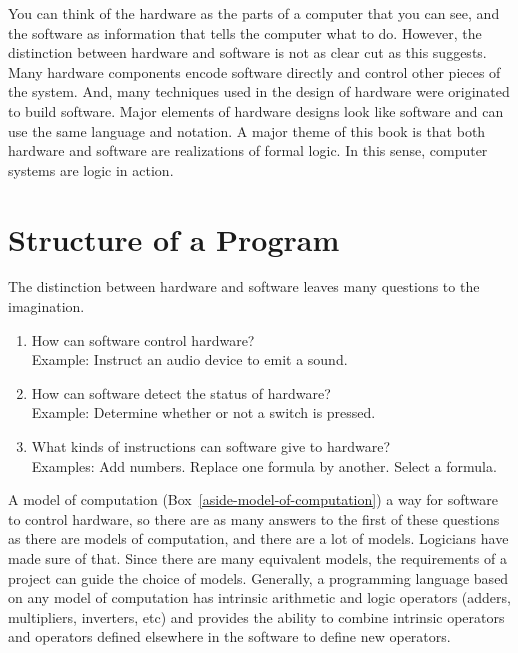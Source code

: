 You can think of the hardware as
the parts of a computer that you can see,
and the software as information that tells the computer what to do.
However, the distinction between hardware and software is not as
clear cut as this suggests. Many hardware components
encode software directly and control other pieces of the system.
And, many techniques used in the design of
hardware were originated to build software.
Major elements of hardware designs look like software
and can use the same language and notation.
A major theme of this book
is that both hardware and software are realizations of formal logic.
In this sense, computer systems are
logic in action.

\section{Structure of a Program}

The distinction between hardware and software
leaves many questions to the imagination.
\begin{enumerate}
\item How can software control hardware?\\
      Example: Instruct an audio device to emit a sound.
\item How can software detect the status of hardware?\\
      Example: Determine whether or not a switch is pressed.
\item What kinds of instructions can software give to hardware?\\
      Examples: Add numbers. Replace one formula by another. Select a formula.
\end{enumerate}

A model of computation (Box~\ref{aside-model-of-computation})
a way for software to control hardware,
so there are as many answers to the first of these questions
as there are models of computation, and
there are a lot of models.
Logicians have made sure of that.
Since there are many equivalent models,
the requirements of a project can guide the choice of models.
Generally, a programming language based on any model of computation
has intrinsic arithmetic and logic operators
(adders, multipliers, inverters, etc)
and provides the ability to combine
intrinsic operators and operators
defined elsewhere in the software to
define new operators.

